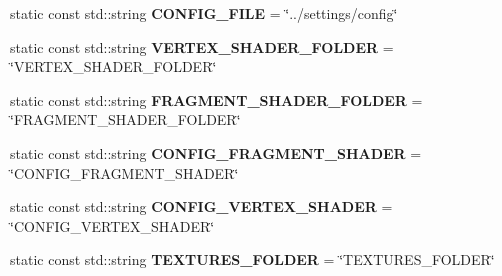 \begin{DoxyCompactItemize}
\item 
\mbox{\label{struct_configuration_1_1_configuration_manager_constants_a257fdcb1912ec9c9baa8a667766af063}} 
static const std\+::string {\bfseries C\+O\+N\+F\+I\+G\+\_\+\+F\+I\+LE} = \char`\"{}../settings/config\char`\"{}
\item 
\mbox{\label{struct_configuration_1_1_configuration_manager_constants_a9d3a7642a0b50f09edd2d122a7e2549f}} 
static const std\+::string {\bfseries V\+E\+R\+T\+E\+X\+\_\+\+S\+H\+A\+D\+E\+R\+\_\+\+F\+O\+L\+D\+ER} = \char`\"{}V\+E\+R\+T\+E\+X\+\_\+\+S\+H\+A\+D\+E\+R\+\_\+\+F\+O\+L\+D\+ER\char`\"{}
\item 
\mbox{\label{struct_configuration_1_1_configuration_manager_constants_a082dd4f38ba39b4cddfc1f688644faa3}} 
static const std\+::string {\bfseries F\+R\+A\+G\+M\+E\+N\+T\+\_\+\+S\+H\+A\+D\+E\+R\+\_\+\+F\+O\+L\+D\+ER} = \char`\"{}F\+R\+A\+G\+M\+E\+N\+T\+\_\+\+S\+H\+A\+D\+E\+R\+\_\+\+F\+O\+L\+D\+ER\char`\"{}
\item 
\mbox{\label{struct_configuration_1_1_configuration_manager_constants_abbb65fd3234d4b1c83d109872f51eec3}} 
static const std\+::string {\bfseries C\+O\+N\+F\+I\+G\+\_\+\+F\+R\+A\+G\+M\+E\+N\+T\+\_\+\+S\+H\+A\+D\+ER} = \char`\"{}C\+O\+N\+F\+I\+G\+\_\+\+F\+R\+A\+G\+M\+E\+N\+T\+\_\+\+S\+H\+A\+D\+ER\char`\"{}
\item 
\mbox{\label{struct_configuration_1_1_configuration_manager_constants_a7a265d62a2cb75b940b0a3762d5ca82d}} 
static const std\+::string {\bfseries C\+O\+N\+F\+I\+G\+\_\+\+V\+E\+R\+T\+E\+X\+\_\+\+S\+H\+A\+D\+ER} = \char`\"{}C\+O\+N\+F\+I\+G\+\_\+\+V\+E\+R\+T\+E\+X\+\_\+\+S\+H\+A\+D\+ER\char`\"{}
\item 
\mbox{\label{struct_configuration_1_1_configuration_manager_constants_a79d9d7e03424e7d3f5b7b79a943e5a24}} 
static const std\+::string {\bfseries T\+E\+X\+T\+U\+R\+E\+S\+\_\+\+F\+O\+L\+D\+ER} = \char`\"{}T\+E\+X\+T\+U\+R\+E\+S\+\_\+\+F\+O\+L\+D\+ER\char`\"{}

\end{DoxyCompactItemize}

